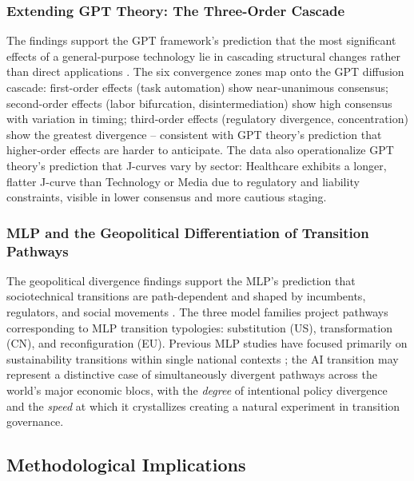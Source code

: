 \documentclass[preprint,review,12pt]{elsarticle}
\begin{document}
\subsubsection{Extending GPT Theory: The Three-Order Cascade}
\label{sec:extending_gpt}

The findings support the GPT framework's prediction that the most significant effects of a general-purpose technology lie in cascading structural changes rather than direct applications \citep{bresnahan1995gpt, helpman1998gpt}. The six convergence zones map onto the GPT diffusion cascade: first-order effects (task automation) show near-unanimous consensus; second-order effects (labor bifurcation, disintermediation) show high consensus with variation in timing; third-order effects (regulatory divergence, concentration) show the greatest divergence -- consistent with GPT theory's prediction that higher-order effects are harder to anticipate. The data also operationalize GPT theory's prediction that J-curves vary by sector: Healthcare exhibits a longer, flatter J-curve than Technology or Media due to regulatory and liability constraints, visible in lower consensus and more cautious staging.


\subsubsection{MLP and the Geopolitical Differentiation of Transition Pathways}
\label{sec:mlp_geopolitical}

The geopolitical divergence findings support the MLP's prediction that sociotechnical transitions are path-dependent and shaped by incumbents, regulators, and social movements \citep{geels2020microfoundations, kern2012mlppolicy}. The three model families project pathways corresponding to MLP transition typologies: substitution (US), transformation (CN), and reconfiguration (EU). Previous MLP studies have focused primarily on sustainability transitions within single national contexts \citep{roberts2019accelerated}; the AI transition may represent a distinctive case of simultaneously divergent pathways across the world's major economic blocs, with the \textit{degree} of intentional policy divergence and the \textit{speed} at which it crystallizes creating a natural experiment in transition governance.


\subsection{Methodological Implications}
\label{sec:methodological_implications}
\end{document}

